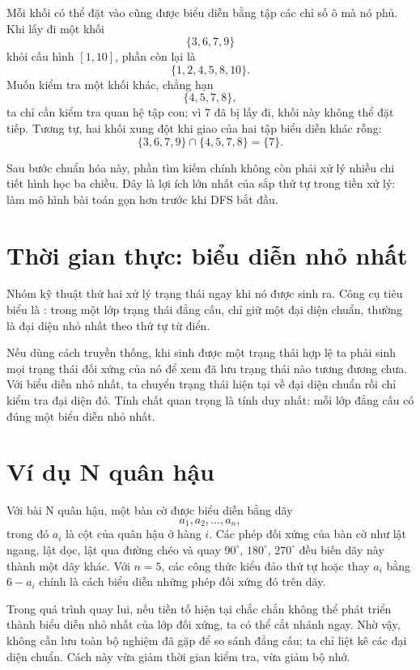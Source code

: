 \documentclass[11pt]{article}
\begin{document}
Mỗi khối có thể đặt vào cũng được biểu diễn bằng tập các chỉ số ô mà nó phủ.
Khi lấy đi một khối
\[
  \{3,6,7,9\}
\]
khỏi cấu hình \([1,10]\), phần còn lại là
\[
  \{1,2,4,5,8,10\}.
\]
Muốn kiểm tra một khối khác, chẳng hạn
\[
  \{4,5,7,8\},
\]
ta chỉ cần kiểm tra quan hệ tập con; vì \(7\) đã bị lấy đi, khối này không
thể đặt tiếp. Tương tự, hai khối xung đột khi giao của hai tập biểu diễn khác
rỗng:
\[
  \{3,6,7,9\}\cap\{4,5,7,8\}=\{7\}.
\]

Sau bước chuẩn hóa này, phần tìm kiếm chính không còn phải xử lý nhiều chi
tiết hình học ba chiều. Đây là lợi ích lớn nhất của sắp thứ tự trong tiền xử
lý: làm mô hình bài toán gọn hơn trước khi DFS bắt đầu.

\section{Thời gian thực: biểu diễn nhỏ nhất}

Nhóm kỹ thuật thứ hai xử lý trạng thái ngay khi nó được sinh ra. Công cụ tiêu
biểu là : trong một lớp trạng thái đẳng cấu, chỉ giữ
một đại diện chuẩn, thường là đại diện nhỏ nhất theo thứ tự từ điển.

Nếu dùng cách truyền thống, khi sinh được một trạng thái hợp lệ ta phải sinh
mọi trạng thái đối xứng của nó để xem đã lưu trạng thái nào tương đương chưa.
Với biểu diễn nhỏ nhất, ta chuyển trạng thái hiện tại về đại diện chuẩn rồi
chỉ kiểm tra đại diện đó. Tính chất quan trọng là tính duy nhất: mỗi lớp đẳng
cấu có đúng một biểu diễn nhỏ nhất.

\section{Ví dụ N quân hậu}

Với bài N quân hậu, một bàn cờ được biểu diễn bằng dãy
\[
  a_1,a_2,\ldots,a_n,
\]
trong đó \(a_i\) là cột của quân hậu ở hàng \(i\). Các phép đối xứng của bàn
cờ như lật ngang, lật dọc, lật qua đường chéo và quay \(90^\circ\),
\(180^\circ\), \(270^\circ\) đều biến dãy này thành một dãy khác. Với
\(n=5\), các công thức kiểu đảo thứ tự hoặc thay \(a_i\) bằng \(6-a_i\) chính
là cách biểu diễn những phép đối xứng đó trên dãy.

Trong quá trình quay lui, nếu tiền tố hiện tại chắc chắn không thể phát triển
thành biểu diễn nhỏ nhất của lớp đối xứng, ta có thể cắt nhánh ngay. Nhờ vậy,
không cần lưu toàn bộ nghiệm đã gặp để so sánh đẳng cấu; ta chỉ liệt kê các
đại diện chuẩn. Cách này vừa giảm thời gian kiểm tra, vừa giảm bộ nhớ.
\end{document}
